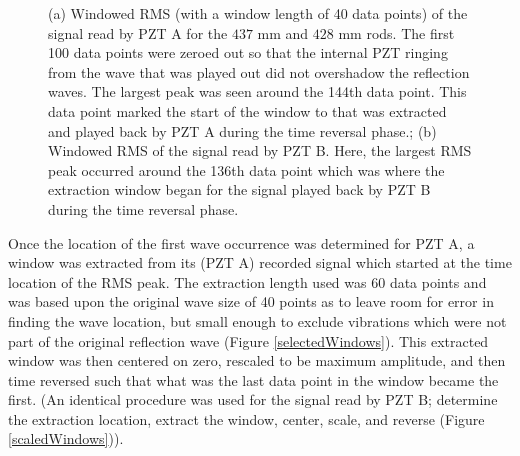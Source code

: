 \documentclass[11pt,letterpaper]{article}%
\begin{document}
\begin{figure}
\begin{subfigmatrix}{2}
\end{subfigmatrix}

   \caption[all]
   { \label{windowedRMS}
(a) Windowed RMS (with a window length of 40 data points) of the signal read by PZT A for the $437$ mm and $428$ mm rods. The first 100 data points were zeroed out so that the internal PZT ringing from the wave that was played out did not overshadow the reflection waves. The largest peak was seen around the 144th data point. This data point marked the start of the window to that was extracted and played back by PZT A during the time reversal phase.;
(b) Windowed RMS of the signal read by PZT B. Here, the largest RMS peak occurred around the 136th data point which was where the extraction window began for the signal played back by PZT B during the time reversal phase.
 }
   \end{figure}

Once the location of the first wave occurrence was determined for PZT A, a window was extracted from its (PZT A) recorded signal which started at the time location of the RMS peak. The extraction length used was 60 data points and was based upon the original wave size of 40 points as to leave room for error in finding the wave location, but small enough to exclude vibrations which were not part of the original reflection wave (Figure \ref{selectedWindows}). This extracted window was then centered on zero, rescaled to be maximum amplitude, and then time reversed such that what was the last data point in the window became the first. (An identical procedure was used for the signal read by PZT B; determine the extraction location, extract the window, center, scale, and reverse  (Figure \ref{scaledWindows})).
\end{document}
